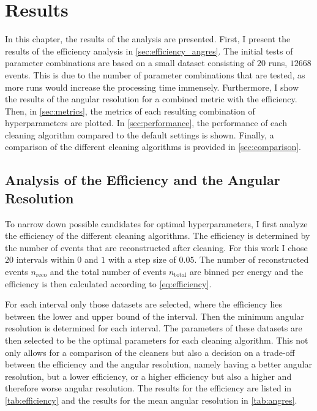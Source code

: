 \chapter{Results}%
\label{ch:results}

In this chapter, the results of the analysis are presented. First, I present the results of the
efficiency analysis in \autoref{sec:efficiency_angres}. The initial tests of parameter combinations
are based on a small dataset consisting of \(\num{20}\) runs, \ie \(\num{12668}\) events. This is
due to the number of parameter combinations that are tested, as more runs would increase the
processing time immensely. Furthermore, I show the results of the angular resolution for a combined
metric with the efficiency. Then, in \autoref{sec:metrics}, the metrics of each resulting combination
of hyperparameters are plotted. In \autoref{sec:performance}, the performance of each cleaning
algorithm compared to the default settings is shown. Finally, a comparison of the different
cleaning algorithms is provided in \autoref{sec:comparison}.


\section{Analysis of the Efficiency and the Angular Resolution}%
\label{sec:efficiency_angres}

To narrow down possible candidates for optimal hyperparameters, I first analyze the efficiency
of the different cleaning algorithms. The efficiency is determined by the number of events that are
reconstructed after cleaning. For this work I chose \(\num{20}\) intervals within \(\num{0}\) and
\(\num{1}\) with a step size of \(\num{0.05}\). The number of reconstructed events \(n_{\mathrm{reco}}\)
and the total number of events \(n_{\mathrm{total}}\) are binned per energy and the efficiency is then
calculated according to \autoref{eq:efficiency}.

For each interval only those datasets are selected, where the efficiency
lies between the lower and upper bound of the interval. Then the minimum angular resolution is
determined for each interval. The parameters of these datasets are then selected to be the optimal
parameters for each cleaning algorithm. This not only allows for a comparison of the cleaners but also
a decision on a trade-off between the efficiency and the angular resolution, namely having a better
angular resolution, but a lower efficiency, or a higher efficiency but also a higher and therefore worse
angular resolution. The results for the efficiency are listed in \autoref{tab:efficiency} and
the results for the mean angular resolution in \autoref{tab:angres}.

